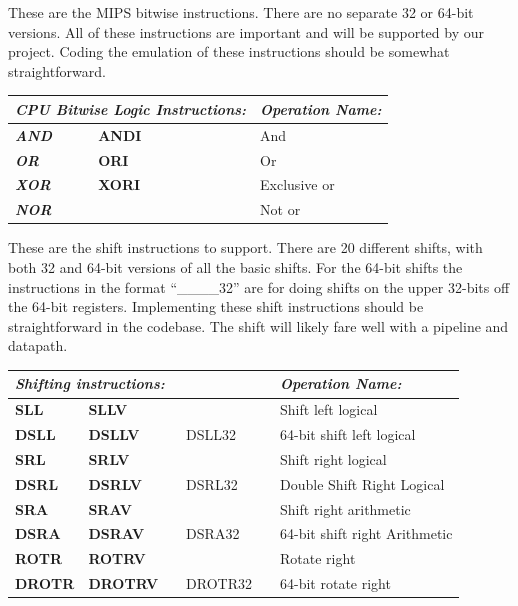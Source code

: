 \documentclass[
    paper=letter,
    parskip=half,
    fontsize=12pt,
    titlepage=firstiscover,
    toc=bibliography,
    numbers=endperiod
]{scrartcl}
\begin{document}
These are the MIPS bitwise instructions. There are no separate 32 or
64-bit versions. All of these instructions are important and will be
supported by our project. Coding the emulation of these instructions
should be somewhat straightforward.

\begin{tabularx}{\textwidth}{lllll|X}
    \multicolumn{5}{l|}{\emph{CPU Bitwise Logic Instructions:}} & \emph{Operation Name:}  \\ \hline
    \emph{\textbf{AND}} & \textbf{ANDI} &  &  &                 & And                     \\
    \emph{\textbf{OR}}  & \textbf{ORI}  &  &  &                 & Or                      \\
    \emph{\textbf{XOR}} & \textbf{XORI} &  &  &                 & Exclusive or            \\
    \emph{\textbf{NOR}} &               &  &  &                 & Not or
\end{tabularx}

These are the shift instructions to support. There are 20 different
shifts, with both 32 and 64-bit versions of all the basic shifts.
For the 64-bit shifts the instructions in the format ``\_\_\_\_32'' are
for doing shifts on the upper 32-bits off the 64-bit registers.
Implementing these shift instructions should be straightforward in the
codebase. The shift will likely fare well with a pipeline and datapath.

\begin{tabularx}{\textwidth}{lllll|X}
    \multicolumn{5}{l|}{\emph{Shifting instructions:}} & \emph{Operation Name:}         \\ \hline
    \textbf{SLL}   & \textbf{SLLV}   &  &         &    & Shift left logical             \\
    \textbf{DSLL}  & \textbf{DSLLV}  &  & DSLL32  &    & 64-bit shift left logical      \\
    \textbf{SRL}   & \textbf{SRLV}   &  &         &    & Shift right logical            \\
    \textbf{DSRL}  & \textbf{DSRLV}  &  & DSRL32  &    & Double Shift Right Logical     \\
    \textbf{SRA}   & \textbf{SRAV}   &  &         &    & Shift right arithmetic         \\
    \textbf{DSRA}  & \textbf{DSRAV}  &  & DSRA32  &    & 64-bit shift right Arithmetic  \\
    \textbf{ROTR}  & \textbf{ROTRV}  &  &         &    & Rotate right                   \\
    \textbf{DROTR} & \textbf{DROTRV} &  & DROTR32 &    & 64-bit rotate right
\end{tabularx}
\end{document}
